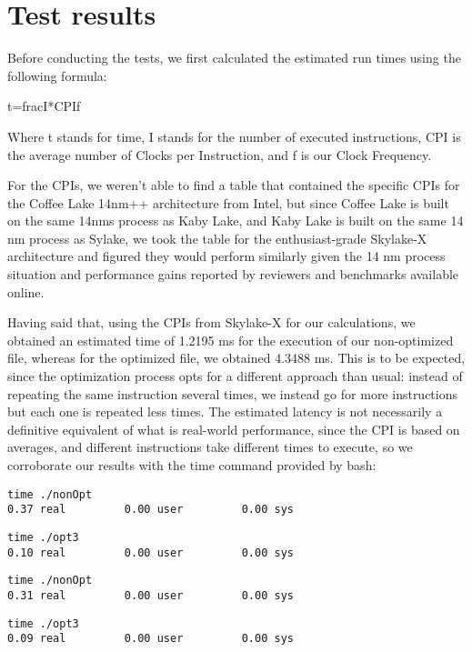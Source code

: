 \documentclass[a4paper]{article}
\begin{document}
\section{Test results}

Before conducting the tests, we first calculated the estimated run times using the following formula:

t=frac{I*CPI}{f}

Where t stands for time, I stands for the number of executed instructions, CPI is the average number of Clocks per Instruction, 
and f is our Clock Frequency.

For the CPIs, we weren't able to find a table that contained the specific CPIs for the Coffee Lake 14nm++ architecture from Intel,
but since Coffee Lake is built on the same 14nms process as Kaby Lake, and Kaby Lake is built on the same 14 nm process as Sylake,
we took the table for the enthusiast-grade Skylake-X architecture and figured they would perform similarly given the 14 nm process 
situation and performance gains reported by reviewers and benchmarks available online.

Having said that, using the CPIs from Skylake-X for our calculations, we obtained an estimated time of 1.2195 ms for the execution of 
our non-optimized file, whereas for the optimized file, we obtained 4.3488 ms. This is to be expected, since the optimization process opts 
for a different approach than usual: instead of repeating the same instruction several times, we instead go for more instructions but each 
one is repeated less times. The estimated latency is not necessarily a definitive equivalent of what is real-world performance, since the CPI 
is based on averages, and different instructions take different times to execute, so we corroborate our results with the time command provided 
by bash:

\begin{lstlisting}
time ./nonOpt
0.37 real         0.00 user         0.00 sys
\end{lstlisting} 

\begin{lstlisting}
time ./opt3
0.10 real         0.00 user         0.00 sys
\end{lstlisting} 

\begin{lstlisting}
time ./nonOpt
0.31 real         0.00 user         0.00 sys
\end{lstlisting} 

\begin{lstlisting}
time ./opt3
0.09 real         0.00 user         0.00 sys
\end{lstlisting}
\end{document}
